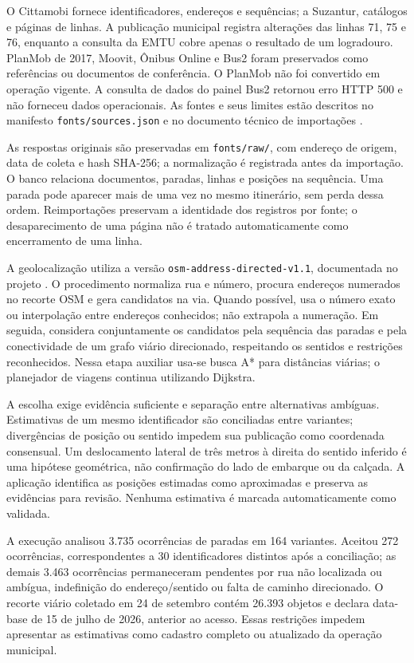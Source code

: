 \documentclass[12pt,oneside,a4paper,brazil]{abntex2}
\begin{document}
O Cittamobi fornece identificadores, endereços e sequências; a Suzantur, catálogos e páginas de linhas. A publicação municipal registra alterações das linhas 71, 75 e 76, enquanto a consulta da EMTU cobre apenas o resultado de um logradouro. PlanMob de 2017, Moovit, Ônibus Online e Bus2 foram preservados como referências ou documentos de conferência. O PlanMob não foi convertido em operação vigente. A consulta de dados do painel Bus2 retornou erro HTTP 500 e não forneceu dados operacionais. As fontes e seus limites estão descritos no manifesto \texttt{fonts/sources.json} e no documento técnico de importações \citep{mbmimportacoes}.

As respostas originais são preservadas em \texttt{fonts/raw/}, com endereço de origem, data de coleta e hash SHA-256; a normalização é registrada antes da importação. O banco relaciona documentos, paradas, linhas e posições na sequência. Uma parada pode aparecer mais de uma vez no mesmo itinerário, sem perda dessa ordem. Reimportações preservam a identidade dos registros por fonte; o desaparecimento de uma página não é tratado automaticamente como encerramento de uma linha.

A geolocalização utiliza a versão \nolinkurl{osm-address-directed-v1.1}, documentada no projeto \citep{mbmimportacoes}. O procedimento normaliza rua e número, procura endereços numerados no recorte OSM e gera candidatos na via. Quando possível, usa o número exato ou interpolação entre endereços conhecidos; não extrapola a numeração. Em seguida, considera conjuntamente os candidatos pela sequência das paradas e pela conectividade de um grafo viário direcionado, respeitando os sentidos e restrições reconhecidos. Nessa etapa auxiliar usa-se busca A* para distâncias viárias; o planejador de viagens continua utilizando Dijkstra.

A escolha exige evidência suficiente e separação entre alternativas ambíguas. Estimativas de um mesmo identificador são conciliadas entre variantes; divergências de posição ou sentido impedem sua publicação como coordenada consensual. Um deslocamento lateral de três metros à direita do sentido inferido é uma hipótese geométrica, não confirmação do lado de embarque ou da calçada. A aplicação identifica as posições estimadas como aproximadas e preserva as evidências para revisão. Nenhuma estimativa é marcada automaticamente como validada.

A execução analisou 3.735 ocorrências de paradas em 164 variantes. Aceitou 272 ocorrências, correspondentes a 30 identificadores distintos após a conciliação; as demais 3.463 ocorrências permaneceram pendentes por rua não localizada ou ambígua, indefinição do endereço/sentido ou falta de caminho direcionado. O recorte viário coletado em 24 de setembro contém 26.393 objetos e declara data-base de 15 de julho de 2026, anterior ao acesso. Essas restrições impedem apresentar as estimativas como cadastro completo ou atualizado da operação municipal.
\end{document}
